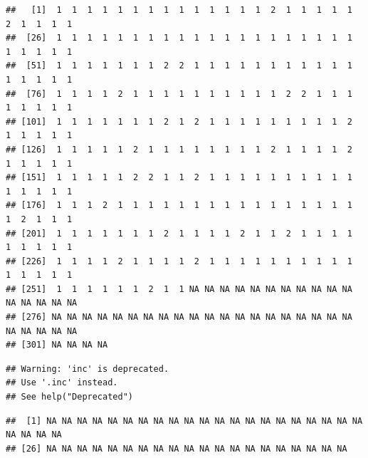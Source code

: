 \documentclass[
]{book}
\newenvironment{Shaded}{\begin{snugshade}}{\end{snugshade}}
\newcommand{\CommentTok}[1]{\textcolor[rgb]{0.56,0.35,0.01}{\textit{#1}}}
\newcommand{\FunctionTok}[1]{\textcolor[rgb]{0.00,0.00,0.00}{#1}}
\newcommand{\NormalTok}[1]{#1}
\newcommand{\SpecialCharTok}[1]{\textcolor[rgb]{0.00,0.00,0.00}{#1}}
\newcommand{\StringTok}[1]{\textcolor[rgb]{0.31,0.60,0.02}{#1}}
\begin{document}
\begin{Shaded}
\end{Shaded}

\begin{verbatim}
##   [1]  1  1  1  1  1  1  1  1  1  1  1  1  1  1  2  1  1  1  1  1  2  1  1  1  1
##  [26]  1  1  1  1  1  1  1  1  1  1  1  1  1  1  1  1  1  1  1  1  1  1  1  1  1
##  [51]  1  1  1  1  1  1  1  2  2  1  1  1  1  1  1  1  1  1  1  1  1  1  1  1  1
##  [76]  1  1  1  1  2  1  1  1  1  1  1  1  1  1  1  2  2  1  1  1  1  1  1  1  1
## [101]  1  1  1  1  1  1  1  2  1  2  1  1  1  1  1  1  1  1  1  2  1  1  1  1  1
## [126]  1  1  1  1  1  2  1  1  1  1  1  1  1  1  2  1  1  1  1  2  1  1  1  1  1
## [151]  1  1  1  1  1  2  2  1  1  2  1  1  1  1  1  1  1  1  1  1  1  1  1  1  1
## [176]  1  1  1  2  1  1  1  1  1  1  1  1  1  1  1  1  1  1  1  1  1  2  1  1  1
## [201]  1  1  1  1  1  1  1  2  1  1  1  1  2  1  1  2  1  1  1  1  1  1  1  1  1
## [226]  1  1  1  1  2  1  1  1  1  2  1  1  1  1  1  1  1  1  1  1  1  1  1  1  1
## [251]  1  1  1  1  1  1  2  1  1 NA NA NA NA NA NA NA NA NA NA NA NA NA NA NA NA
## [276] NA NA NA NA NA NA NA NA NA NA NA NA NA NA NA NA NA NA NA NA NA NA NA NA NA
## [301] NA NA NA NA
\end{verbatim}

\begin{Shaded}
\end{Shaded}

\begin{verbatim}
## Warning: 'inc' is deprecated.
## Use '.inc' instead.
## See help("Deprecated")
\end{verbatim}

\begin{verbatim}
##  [1] NA NA NA NA NA NA NA NA NA NA NA NA NA NA NA NA NA NA NA NA NA NA NA NA NA
## [26] NA NA NA NA NA NA NA NA NA NA NA NA NA NA NA NA NA NA NA NA
\end{verbatim}
\end{document}

